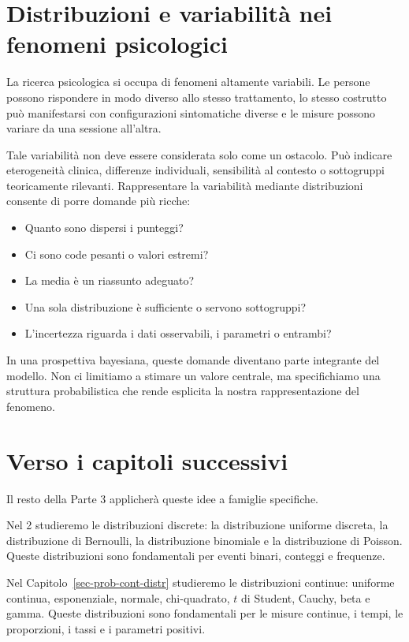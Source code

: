 \documentclass[
  italian,
  letterpaper,
  a4paper,
  11pt,
  open=any]{scrbook}
\providecommand{\tightlist}{%
  \setlength{\itemsep}{0pt}\setlength{\parskip}{0pt}}
\theoremstyle{plain}
\theoremstyle{definition}
\theoremstyle{definition}
\theoremstyle{remark}
\begin{document}
\section{Distribuzioni e variabilità nei fenomeni
psicologici}\label{sec-psychological-variability}

La ricerca psicologica si occupa di fenomeni altamente variabili. Le
persone possono rispondere in modo diverso allo stesso trattamento, lo
stesso costrutto può manifestarsi con configurazioni sintomatiche
diverse e le misure possono variare da una sessione all'altra.

Tale variabilità non deve essere considerata solo come un ostacolo. Può
indicare eterogeneità clinica, differenze individuali, sensibilità al
contesto o sottogruppi teoricamente rilevanti. Rappresentare la
variabilità mediante distribuzioni consente di porre domande più ricche:

\begin{itemize}
\tightlist
\item
  Quanto sono dispersi i punteggi?
\item
  Ci sono code pesanti o valori estremi?
\item
  La media è un riassunto adeguato?
\item
  Una sola distribuzione è sufficiente o servono sottogruppi?
\item
  L'incertezza riguarda i dati osservabili, i parametri o entrambi?
\end{itemize}

In una prospettiva bayesiana, queste domande diventano parte integrante
del modello. Non ci limitiamo a stimare un valore centrale, ma
specifichiamo una struttura probabilistica che rende esplicita la nostra
rappresentazione del fenomeno.

\section{Verso i capitoli
successivi}\label{sec-towards-specific-distributions}

Il resto della Parte 3 applicherà queste idee a famiglie specifiche.

Nel 2 studieremo le distribuzioni discrete: la distribuzione uniforme
discreta, la distribuzione di Bernoulli, la distribuzione binomiale e la
distribuzione di Poisson. Queste distribuzioni sono fondamentali per
eventi binari, conteggi e frequenze.

Nel Capitolo~\ref{sec-prob-cont-distr} studieremo le distribuzioni
continue: uniforme continua, esponenziale, normale, chi-quadrato, \(t\)
di Student, Cauchy, beta e gamma. Queste distribuzioni sono fondamentali
per le misure continue, i tempi, le proporzioni, i tassi e i parametri
positivi.
\end{document}
